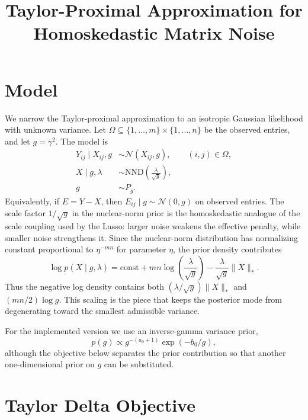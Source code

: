 \documentclass[11pt]{article}
\title{Taylor-Proximal Approximation for Homoskedastic Matrix Noise}
\author{}
\date{}
\begin{document}
\maketitle

\section{Model}

We narrow the Taylor-proximal approximation to an isotropic Gaussian
likelihood with unknown variance.  Let
$\Omega \subseteq \{1,\ldots,m\}\times\{1,\ldots,n\}$ be the observed entries,
and let $g=\gamma^2$.  The model is
\begin{align}
    Y_{ij} \mid X_{ij}, g
        &\sim \mathcal{N}(X_{ij}, g),
        \qquad (i,j)\in\Omega, \\
    X \mid g,\lambda
        &\sim \mathrm{NND}\!\left(\frac{\lambda}{\sqrt{g}}\right), \\
    g &\sim P_g .
\end{align}
Equivalently, if $E=Y-X$, then $E_{ij}\mid g\sim\mathcal{N}(0,g)$ on
observed entries.  The scale factor $1/\sqrt{g}$ in the nuclear-norm prior is
the homoskedastic analogue of the scale coupling used by the Lasso: larger
noise weakens the effective penalty, while smaller noise strengthens it.  Since
the nuclear-norm distribution has normalizing constant proportional to
$\eta^{-mn}$ for parameter $\eta$, the prior density contributes
\begin{equation}
    \log p(X\mid g,\lambda)
        = \mathrm{const}
        + mn\log\!\left(\frac{\lambda}{\sqrt{g}}\right)
        - \frac{\lambda}{\sqrt{g}}\|X\|_* .
\end{equation}
Thus the negative log density contains both
$(\lambda/\sqrt{g})\|X\|_*$ and $(mn/2)\log g$.  This scaling is the piece that
keeps the posterior mode from degenerating toward the smallest admissible
variance.

For the implemented version we use an inverse-gamma variance prior,
\begin{equation}
    p(g) \propto g^{-(a_0+1)}\exp(-b_0/g),
\end{equation}
although the objective below separates the prior contribution so that another
one-dimensional prior on $g$ can be substituted.

\section{Taylor Delta Objective}
\end{document}
